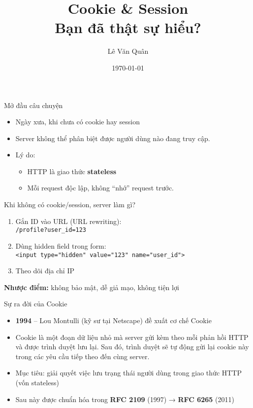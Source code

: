\documentclass[aspectratio=169]{beamer}
\title{Cookie \& Session\\Bạn đã thật sự hiểu?}
\author{Lê Văn Quân}
\date{\today}
\begin{document}
\begin{frame}
  \titlepage
\end{frame}

\begin{frame}{Mở đầu câu chuyện}
  \begin{itemize}
    \item Ngày xưa, khi chưa có cookie hay session
    \item Server không thể phân biệt được người dùng nào đang truy cập.
    \item Lý do:
    \begin{itemize}
        \item HTTP là giao thức \textbf{stateless}
        \item Mỗi request độc lập, không ``nhớ'' request trước.
    \end{itemize}
  \end{itemize}
\end{frame}

\begin{frame}{Khi không có cookie/session, server làm gì?}
  \begin{enumerate}
    \item Gắn ID vào URL (URL rewriting):\\
    \texttt{/profile?user\_id=123}
    \item Dùng hidden field trong form:\\
    \texttt{<input type="hidden" value="123" name="user\_id">}
    \item Theo dõi địa chỉ IP
  \end{enumerate}
  \vspace{1em}
  \textbf{Nhược điểm:} không bảo mật, dễ giả mạo, không tiện lợi
\end{frame}

\begin{frame}{Sự ra đời của Cookie}
  \begin{itemize}
    \item \textbf{1994} – Lou Montulli (kỹ sư tại Netscape) đề xuất cơ chế Cookie
    \item Cookie là một đoạn dữ liệu nhỏ mà server gửi kèm theo mỗi phản hồi HTTP và được trình duyệt lưu lại. Sau đó, trình duyệt sẽ tự động gửi lại cookie này trong các yêu cầu tiếp theo đến cùng server.
    \item Mục tiêu: giải quyết việc lưu trạng thái người dùng trong giao thức HTTP (vốn stateless)
    \item Sau này được chuẩn hóa trong \textbf{RFC 2109} (1997) → \textbf{RFC 6265} (2011)
  \end{itemize}
\end{frame}
\end{document}
